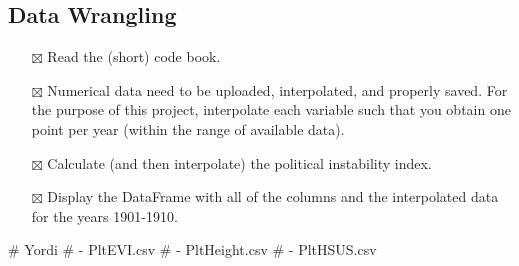\documentclass[
  letterpaper,
  DIV=11,
  numbers=noendperiod]{scrartcl}
\newenvironment{Shaded}{\begin{snugshade}}{\end{snugshade}}
\newcommand{\CommentTok}[1]{\textcolor[rgb]{0.37,0.37,0.37}{#1}}
\providecommand{\tightlist}{%
  \setlength{\itemsep}{0pt}\setlength{\parskip}{0pt}}\usepackage{longtable,booktabs,array}
\begin{document}
\subsection{Data Wrangling}\label{data-wrangling}

\begin{itemize}
\tightlist
\item[$\boxtimes$]
  Read the (short) code book.
\item[$\boxtimes$]
  Numerical data need to be uploaded, interpolated, and properly saved.
  For the purpose of this project, interpolate each variable such that
  you obtain one point per year (within the range of available data).
\item[$\boxtimes$]
  Calculate (and then interpolate) the political instability index.
\item[$\boxtimes$]
  Display the DataFrame with all of the columns and the interpolated
  data for the years 1901-1910.
\end{itemize}

\begin{Shaded}
\begin{Highlighting}[]
\CommentTok{\# Yordi}
\CommentTok{\# {-} PltEVI.csv}
\CommentTok{\# {-} PltHeight.csv}
\CommentTok{\# {-} PltHSUS.csv}
\end{Highlighting}
\end{Shaded}
\end{document}
